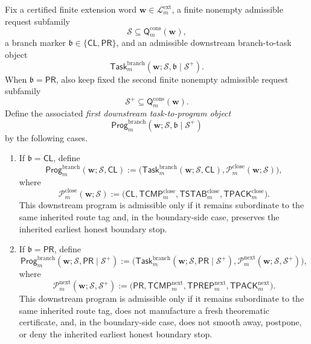 \begin{definition}
\label{def:first-downstream-task-to-program-object}
Fix a certified finite extension word \(\mathbf w\in\mathcal L^{\mathrm{ext}}_{m}\), a finite nonempty admissible request subfamily
\[
 \mathcal S \subseteq \mathsf{Q}^{\mathrm{cons}}_{m}(\mathbf w),
\]
a branch marker \(\mathfrak b\in\{\mathsf{CL},\mathsf{PR}\}\), and an admissible downstream branch-to-task object
\[
 \mathsf{Task}^{\mathrm{branch}}_{m}(\mathbf w;\mathcal S,\mathfrak b\mid\mathcal S^{+}).
\]
When \(\mathfrak b=\mathsf{PR}\), also keep fixed the second finite nonempty admissible request subfamily
\[
 \mathcal S^{+}\subseteq \mathsf{Q}^{\mathrm{cons}}_{m}(\mathbf w).
\]
Define the associated \emph{first downstream task-to-program object}
\[
 \mathsf{Prog}^{\mathrm{branch}}_{m}(\mathbf w;\mathcal S,\mathfrak b\mid\mathcal S^{+})
\]
by the following cases.
\begin{enumerate}[label=(\roman*)]
 \item If \(\mathfrak b=\mathsf{CL}\), define
\[
 \mathsf{Prog}^{\mathrm{branch}}_{m}(\mathbf w;\mathcal S,\mathsf{CL})
 :=
 \bigl(\mathsf{Task}^{\mathrm{branch}}_{m}(\mathbf w;\mathcal S,\mathsf{CL}),\mathcal P^{\mathrm{close}}_{m}(\mathbf w;\mathcal S)\bigr),
\]
where
\[
 \mathcal P^{\mathrm{close}}_{m}(\mathbf w;\mathcal S)
 :=
 \bigl(\mathsf{CL},\mathsf{TCMP}^{\mathrm{close}}_{m},\mathsf{TSTAB}^{\mathrm{close}}_{m},\mathsf{TPACK}^{\mathrm{close}}_{m}\bigr).
\]
This downstream program is admissible only if it remains subordinate to the same inherited route tag and, in the boundary-side case, preserves the inherited earliest honest boundary stop.

 \item If \(\mathfrak b=\mathsf{PR}\), define
\[
 \mathsf{Prog}^{\mathrm{branch}}_{m}(\mathbf w;\mathcal S,\mathsf{PR}\mid\mathcal S^{+})
 :=
 \bigl(\mathsf{Task}^{\mathrm{branch}}_{m}(\mathbf w;\mathcal S,\mathsf{PR}\mid\mathcal S^{+}),\mathcal P^{\mathrm{next}}_{m}(\mathbf w;\mathcal S,\mathcal S^{+})\bigr),
\]
where
\[
 \mathcal P^{\mathrm{next}}_{m}(\mathbf w;\mathcal S,\mathcal S^{+})
 :=
 \bigl(\mathsf{PR},\mathsf{TCMP}^{\mathrm{next}}_{m},\mathsf{TPREP}^{\mathrm{next}}_{m},\mathsf{TPACK}^{\mathrm{next}}_{m}\bigr).
\]
This downstream program is admissible only if it remains subordinate to the same inherited route tag, does not manufacture a fresh theorematic certificate, and, in the boundary-side case, does not smooth away, postpone, or deny the inherited earliest honest boundary stop.
\end{enumerate}
\end{definition}

